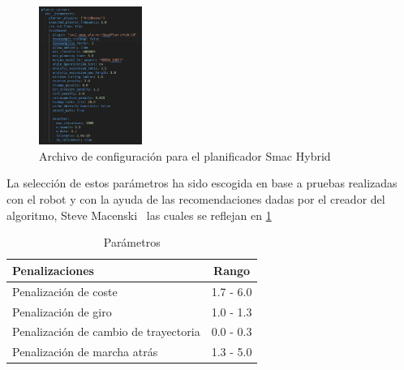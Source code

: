 \begin{figure}[H]
    \centering
    \includegraphics[width=0.3\textwidth]{images/configuracion_planner.png}
    \caption{Archivo de configuración para el planificador Smac Hybrid}
    \label{fig:configuracion_planner}
\end{figure}

La selección de estos parámetros ha sido escogida en base a pruebas realizadas con el robot y con la ayuda de las recomendaciones dadas 
por el creador del algoritmo, Steve Macenski~\cite{steve_mc} las cuales se reflejan en \ref{tab:parametros_planificador_steve}

\begin{table}[h!]
    \centering
    \caption{Parámetros}
    \begin{tabular}{|l|c|}
        \hline
        Penalizaciones     & Rango      \\ \hline
        Penalización de coste          & 1.7 - 6.0  \\ \hline
        Penalización de giro  & 1.0 - 1.3  \\ \hline
        Penalización de cambio de trayectoria        & 0.0 - 0.3  \\ \hline
        Penalización de marcha atrás       & 1.3 - 5.0  \\ \hline
    \end{tabular}
    \label{tab:parametros_planificador_steve}
\end{table}

